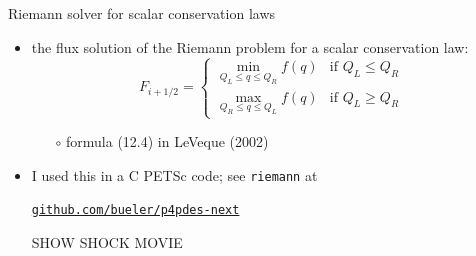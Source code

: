 \documentclass[10pt,hyperref,dvipsnames]{beamer}
\begin{document}
\begin{frame}{Riemann solver for scalar conservation laws}

\begin{itemize}
\item the flux solution of the Riemann problem for a scalar conservation law:
    $$F_{i+1/2} = \begin{cases} {\displaystyle \min_{Q_L \le q \le Q_R} f(q)} & \text{if } Q_L \le Q_R \\ {\displaystyle \max_{Q_R \le q \le Q_L} f(q)} & \text{if } Q_L \ge Q_R \end{cases}$$

    \begin{itemize}
    \item[$\circ$] formula (12.4) in LeVeque (2002)
    \end{itemize}
\item I used this in a C PETSc code; see \texttt{riemann} at
\begin{center}
\href{https://github.com/bueler/p4pdes-next}{\texttt{github.com/bueler/p4pdes-next}}
\end{center}

\vspace{10mm}
\begin{center}
\alert{SHOW SHOCK MOVIE}
\end{center}
\end{itemize}

\end{frame}
\end{document}
